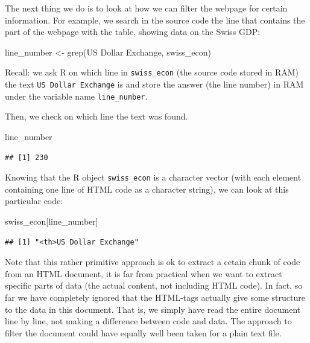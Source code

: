 \documentclass[
  12pt,
]{style/krantz}
\newenvironment{Shaded}{\begin{snugshade}}{\end{snugshade}}
\newcommand{\FunctionTok}[1]{\textcolor[rgb]{0.00,0.00,0.00}{#1}}
\newcommand{\NormalTok}[1]{#1}
\newcommand{\OtherTok}[1]{\textcolor[rgb]{0.56,0.35,0.01}{#1}}
\newcommand{\StringTok}[1]{\textcolor[rgb]{0.31,0.60,0.02}{#1}}
\begin{document}
\begin{verbatim}
\end{verbatim}

The next thing we do is to look at how we can filter the webpage for certain information. For example, we search in the source code the line that contains the part of the webpage with the table, showing data on the Swiss GDP:

\begin{Shaded}
\begin{Highlighting}[]
\NormalTok{line\_number }\OtherTok{\textless{}{-}} \FunctionTok{grep}\NormalTok{(}\StringTok{\textquotesingle{}US Dollar Exchange\textquotesingle{}}\NormalTok{, swiss\_econ)}
\end{Highlighting}
\end{Shaded}

Recall: we ask R on which line in \texttt{swiss\_econ} (the source code stored in RAM) the text \texttt{US\ Dollar\ Exchange} is and store the answer (the line number) in RAM under the variable name \texttt{line\_number}.

Then, we check on which line the text was found.

\begin{Shaded}
\begin{Highlighting}[]
\NormalTok{line\_number}
\end{Highlighting}
\end{Shaded}

\begin{verbatim}
## [1] 230
\end{verbatim}

Knowing that the R object \texttt{swiss\_econ} is a character vector (with each element containing one line of HTML code as a character string), we can look at this particular code:

\begin{Shaded}
\begin{Highlighting}[]
\NormalTok{swiss\_econ[line\_number]}
\end{Highlighting}
\end{Shaded}

\begin{verbatim}
## [1] "<th>US Dollar Exchange"
\end{verbatim}

Note that this rather primitive approach is ok to extract a cetain chunk of code from an HTML document, it is far from practical when we want to extract specific parts of data (the actual content, not including HTML code). In fact, so far we have completely ignored that the HTML-tags actually give some structure to the data in this document. That is, we simply have read the entire document line by line, not making a difference between code and data. The approach to filter the document could have equally well been taken for a plain text file.
\end{document}
